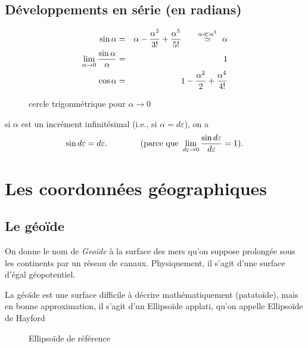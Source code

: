 \documentclass[12pt]{report}
\begin{document}
\bigskip\bigskip

\par\noindent
\section{Développements en série (en radians)}

\begin{eqnarray*}
\sin \alpha &=&  \alpha - {\alpha^3 \over 3!} + {\alpha^5 \over 5!} \qquad  {\stackrel{ \alpha \ll \alpha^3}{\simeq}} \ \ \alpha \\
\lim_{\alpha \to 0} {\sin \alpha \over \alpha} &=& 1 \\
\cos \alpha &=& 1 - {\alpha^2\over 2} + {\alpha^4\over 4!} \\
\end{eqnarray*}

\begin{figure}[h]
\begin{center}
\end{center}
\caption{cercle trigonmétrique pour $\alpha \rightarrow 0$}
\label{fig:3}
\end{figure}

si $\alpha$ est un incrément infinitésimal (i.e., si $\alpha=d \varepsilon $), on a
\[
\sin d\varepsilon = d \varepsilon. \qquad\qquad (\mbox{parce que} \ \lim_{d \varepsilon \to 0} {\sin d \varepsilon \over d \varepsilon} = 1).
\]


\chapter{{Les coordonnées géographiques}}

\bigskip
 
\section{Le géoïde}  On donne le nom de \textit{\sc Geoïde} à la surface des mers qu'on suppose prolongée sous les continents par un réseau de canaux. Physiquement, il s'agit d'une surface d'égal géopotentiel.

La géoïde est une surface difficile à décrire mathématiquement (patatoïde), mais en bonne approximation, il s'agit d'un {\sc Ellipsoïde applati}, qu'on appelle {\sc Ellipsoïde de Hayford}

\begin{figure}[ht]
\begin{center}
\end{center}
\caption{Ellipsoïde de référence}
\label{fig:4}
\end{figure}
\end{document}
